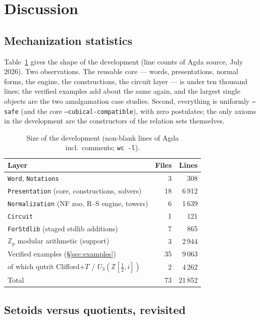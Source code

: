 \section{Discussion}\label{sec:discussion}

\subsection{Mechanization statistics}

Table~\ref{tab:stats} gives the shape of the development (line counts of
Agda source, July 2026).  Two observations.  The reusable core ---
words, presentations, normal forms, the engine, the constructions, the
circuit layer --- is under ten thousand lines; the verified examples add
about the same again, and the largest single objects are the two
amalgamation case studies.  Second, everything is uniformly
\texttt{--safe} (and the core \texttt{--cubical-compatible}),
with zero postulates; the only axioms in the development are the
 constructors of the relation sets themselves.

\begin{table}[h]
\caption{Size of the development (non-blank lines of Agda incl.\
comments; \texttt{wc -l}).}
\label{tab:stats}
\centering
\small
\begin{tabular}{@{}lrr@{}}
\toprule
Layer & Files & Lines \\
\midrule
\texttt{Word}, \texttt{Notations} & 3 & 308 \\
\texttt{Presentation} (core, constructions, solvers) & 18 & 6\,912 \\
\texttt{Normalization} (NF zoo, R--S engine, towers) & 6 & 1\,639 \\
\texttt{Circuit} & 1 & 121 \\
\texttt{ForStdlib} (staged stdlib additions) & 7 & 865 \\
$\mathbb{Z}_p$ modular arithmetic (support) & 3 & 2\,944 \\
\midrule
Verified examples (\S\ref{sec:examples}) & 35 & 9\,063 \\
\quad of which qutrit Clifford+$T$ / $U_3(\mathbb{Z}[\frac12,i])$ & 2 & 4\,262 \\
\midrule
Total & 73 & 21\,852 \\
\bottomrule
\end{tabular}
\end{table}

\subsection{Setoids versus quotients, revisited}

